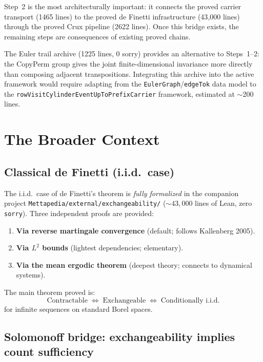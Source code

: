 \documentclass[11pt]{article}
\theoremstyle{definition}
\newcommand{\lean}[1]{\texttt{#1}}
\begin{document}
Step~2 is the most architecturally important: it connects the proved
carrier transport (1465 lines) to the proved de Finetti infrastructure
(43{,}000 lines) through the proved Crux pipeline (2622 lines).  Once
this bridge exists, the remaining steps are consequences of existing
proved chains.

The Euler trail archive (1225 lines, 0 sorry) provides an alternative
to Steps~1--2: the CopyPerm group gives the joint finite-dimensional
invariance more directly than composing adjacent transpositions.
Integrating this archive into the active framework would require
adapting from the \lean{EulerGraph}/\lean{edgeTok} data model to the
\lean{rowVisitCylinderEventUpToPrefixCarrier} framework, estimated at
$\sim$200 lines.

\section{The Broader Context}
\label{sec:context}

\subsection{Classical de Finetti (i.i.d.\ case)}

The i.i.d.\ case of de Finetti's theorem is \emph{fully formalized} in
the companion project \texttt{Mettapedia/external/exchangeability/}
(${\sim}43{,}000$ lines of Lean, zero \texttt{sorry}).  Three independent
proofs are provided:

\begin{enumerate}[leftmargin=2em]
\item \textbf{Via reverse martingale convergence} (default; follows
  Kallenberg 2005).
\item \textbf{Via $L^2$ bounds} (lightest dependencies; elementary).
\item \textbf{Via the mean ergodic theorem} (deepest theory; connects to
  dynamical systems).
\end{enumerate}

The main theorem proved is:
\[
\text{Contractable} \;\Longleftrightarrow\;
\text{Exchangeable} \;\Longleftrightarrow\;
\text{Conditionally i.i.d.}
\]
for infinite sequences on standard Borel spaces.

\subsection{Solomonoff bridge: exchangeability implies count sufficiency}
\end{document}
